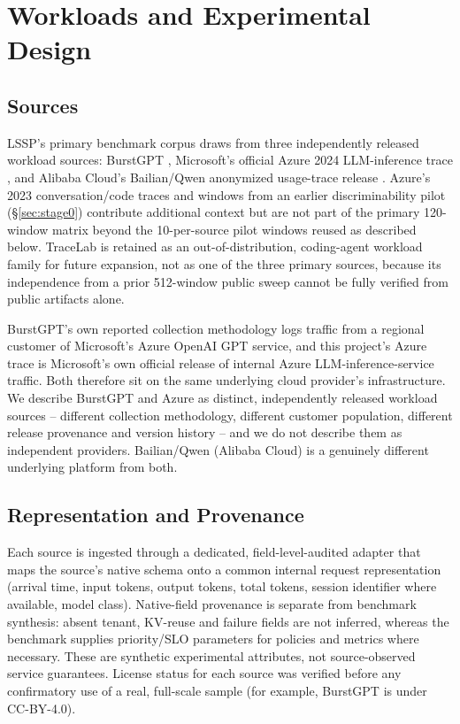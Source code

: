 \section{Workloads and Experimental Design}\label{sec:workloads}
\subsection{Sources}
\label{sec:sources}

LSSP's primary benchmark corpus draws from three independently released
workload sources: BurstGPT \citep{burstgpt2025}, Microsoft's official Azure
2024 LLM-inference trace \citep{azure2024trace,stojkovic2025dynamollm}, and
Alibaba Cloud's Bailian/Qwen anonymized usage-trace
release \citep{bailianqwen2026}. Azure's 2023 conversation/code traces
\citep{patel2024splitwise} and windows from an earlier discriminability
pilot (\S\ref{sec:stage0}) contribute additional context but are not part
of the primary 120-window matrix beyond the 10-per-source pilot windows
reused as described below. TraceLab \citep{tracelab2026} is retained as an
out-of-distribution, coding-agent workload family for future expansion,
not as one of the three primary sources, because its independence from a
prior 512-window public sweep cannot be fully verified from public
artifacts alone.

BurstGPT's own reported
collection methodology logs traffic from a regional customer of Microsoft's
Azure OpenAI GPT service, and this project's Azure trace is Microsoft's own
official release of internal Azure LLM-inference-service traffic. Both
therefore sit on the same underlying cloud provider's infrastructure. We
describe BurstGPT and Azure as distinct, independently released workload
sources -- different collection methodology, different customer
population, different release provenance and version history -- and we do
not describe them as independent providers. Bailian/Qwen (Alibaba Cloud)
is a genuinely different underlying platform from both.

\subsection{Representation and Provenance}
\label{sec:provenance}

Each source is ingested through a dedicated, field-level-audited adapter that maps the source's native
schema onto a common internal request representation (arrival time, input
tokens, output tokens, total tokens, session identifier where available,
model class). Native-field provenance is separate from benchmark synthesis: absent tenant, KV-reuse and failure fields are not inferred, whereas the benchmark supplies priority/SLO parameters for policies and metrics where necessary. These are synthetic experimental attributes, not source-observed service guarantees. License status for each source was verified before any confirmatory use of a real, full-scale sample (for example, BurstGPT is under CC-BY-4.0).

